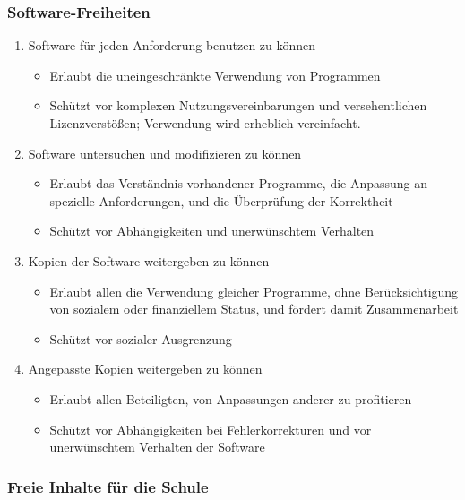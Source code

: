 \documentclass{beamer}
\begin{document}
\begin{frame}
  \frametitle{Software-Freiheiten}


  \onslide<+->

  \begin{enumerate}

  \item<+-> Software für jeden Anforderung benutzen zu können
    \begin{itemize}
    \item Erlaubt die uneingeschränkte Verwendung von Programmen
    \item Schützt vor komplexen Nutzungsvereinbarungen und versehentlichen
      Lizenzverstößen; Verwendung wird erheblich vereinfacht.
    \end{itemize}

  \item<+-> Software untersuchen und modifizieren zu können
    \begin{itemize}
    \item Erlaubt das Verständnis vorhandener Programme, die Anpassung an
      spezielle Anforderungen, und die Überprüfung der Korrektheit
    \item Schützt vor Abhängigkeiten und unerwünschtem Verhalten
    \end{itemize}

  \item<+-> Kopien der Software weitergeben zu können
    \begin{itemize}
    \item Erlaubt allen die Verwendung gleicher Programme, ohne Berücksichtigung
      von sozialem oder finanziellem Status, und fördert damit Zusammenarbeit
    \item Schützt vor sozialer Ausgrenzung
    \end{itemize}

  \item<+-> Angepasste Kopien weitergeben zu können
    \begin{itemize}
    \item Erlaubt allen Beteiligten, von Anpassungen anderer zu profitieren
    \item Schützt vor Abhängigkeiten bei Fehlerkorrekturen und vor unerwünschtem
      Verhalten der Software
    \end{itemize}
  \end{enumerate}

\end{frame}

\begin{frame}
  \frametitle{Freie Inhalte für die Schule}


\end{frame}
\end{document}
